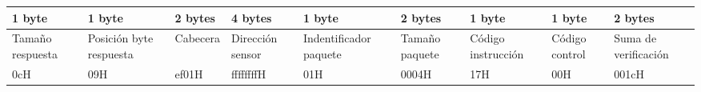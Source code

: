 \documentclass{standalone}
\begin{document}
%
\tiny
\begin{tabular}{|C{1.2cm}|C{1.4cm}|C{1.2cm}|C{1.2cm}|C{1.4cm}|C{1.2cm}|C{1.2cm}|C{1.2cm}|C{1.4cm}|}
   byte & 1 byte & 2 bytes & 4 bytes & 1 byte & 2 bytes & 1 byte & 1 byte & 2 bytes \\
  \hline
  Tamaño respuesta & Posición byte respuesta & Cabecera & Dirección sensor & Indentificador paquete & Tamaño paquete & Código instrucción & Código control & Suma de verificación \\
  \hline
  0cH & 09H & ef01H & ffffffffH & 01H & 0004H & 17H & 00H & 001cH \\
  \hline
\end{tabular}
\end{document}
